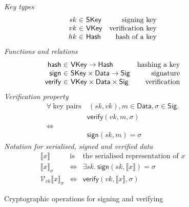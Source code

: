 \documentclass[11pt,a4paper]{article}
\begin{document}
\begin{figure}

\emph{Key types}
%
\begin{equation*}
\begin{array}{r@{~\in~}lr}
  sk
& \mathsf{SKey}
& \text{signing key}
\\
  vk
& \mathsf{VKey}
& \text{verification key}
\\
  hk
& \mathsf{Hash}
& \text{hash of a key}
\end{array}
\end{equation*}
%
\emph{Functions and relations}
%
\begin{equation*}
\begin{array}{r@{~\in~}lr}
  \mathsf{hash} & \mathsf{VKey} \to \mathsf{Hash}
& \text{hashing a key}
\\
  \mathsf{sign} & \mathsf{SKey} \times \mathsf{Data} \to \mathsf{Sig}
& \text{signature}
\\
  \mathsf{verify} & \mathsf{VKey} \times \mathsf{Data} \times \mathsf{Sig}
& \text{verification}
\end{array}
\end{equation*}
%
\emph{Verification property}
%
\begin{align*}
\forall ~ \text{key pairs} & ~ (sk, vk), m \in \mathsf{Data}, \sigma \in \mathsf{Sig}. \\
     & \mathsf{verify} (\mathit{vk}, m, \sigma) \\
\iff & \\
     & \mathsf{sign} (\mathit{sk}, m) = \sigma
\end{align*}
%
\emph{Notation for serialised, signed and verified data}
%
\begin{equation*}
\begin{array}{lcl}
  \llbracket x \rrbracket
& \text{is}
& \text{the serialised representation of } x
\\[0.2em]
  \llbracket x \rrbracket_\sigma
& \iff
& \exists \mathit{sk}. ~ \mathsf{sign} (sk, \llbracket x \rrbracket) = \sigma
\\[0.2em]
  \mathcal{V}_{\mathit{vk}}\llbracket x \rrbracket_\sigma
& \iff
& \mathsf{verify} (\mathit{vk}, \llbracket x \rrbracket, \sigma)
\end{array}
\end{equation*}

\caption{\label{fig:crypto}Cryptographic operations for signing and verifying}
\end{figure}
\end{document}
